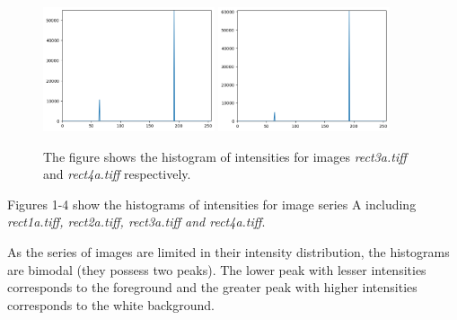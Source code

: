 \documentclass[runningheads]{llncs}
\begin{document}
\begin{figure}[h!]
\centering
\includegraphics[width=0.45\textwidth]
{Report/Result_Images/histogram_a3.png}
\includegraphics[width=0.45\textwidth]
{Report/Result_Images/histogram_a4.png}
\caption*{The figure shows the histogram of intensities for images \emph{rect3a.tiff} and \emph{rect4a.tiff} respectively. } \label{Histogram-3a&4a}
\end{figure}

Figures 1-4 show the histograms of intensities for image series A including {\emph{rect1a.tiff, rect2a.tiff, rect3a.tiff and rect4a.tiff}}. 
\par As the series of images are limited in their intensity distribution, the histograms are bimodal (they possess two peaks). The lower peak with lesser intensities corresponds to the foreground and the greater peak with higher intensities corresponds to the white background.
\end{document}
